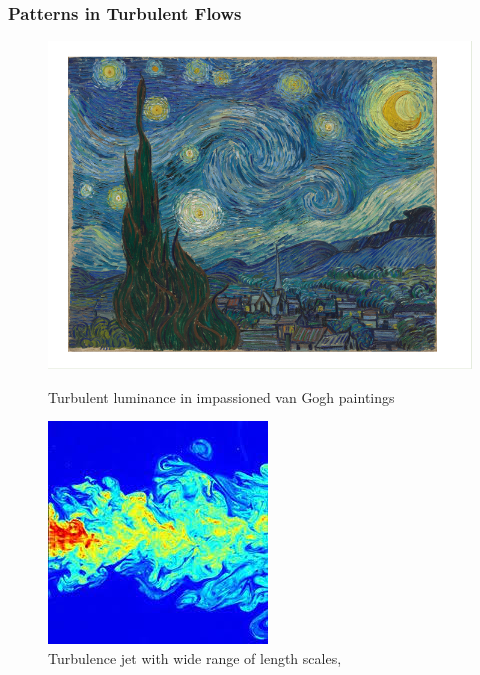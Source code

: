 \documentclass{beamer}
\begin{document}
\begin{frame}
\frametitle{Patterns in Turbulent Flows}
\begin{figure}[!htb]%
    \centering%
    \begin{minipage}{.5\textwidth}%
        \centering%
        \includegraphics[height=0.72\linewidth, trim = 1.15cm 1.15cm 1.90cm 1.15cm, clip]{img/starryNight_vanGogh.png}%
        \caption{\tiny{Turbulent luminance in impassioned van Gogh paintings} ~\parencite{aragon2008turbulent}}%
        \label{fig:prob1_6_2}%
    \end{minipage}%
    \begin{minipage}{0.5\textwidth}%
        \centering%
        \includegraphics[height=0.72\linewidth]{img/energyCasacade.jpeg}
        \caption{\tiny{Turbulence jet  with wide range of length scales}, ~\parencite{energyCascade}}%
        \label{fig:prob1_6_1}%
    \end{minipage}%
\end{figure}
\end{frame}
\end{document}
